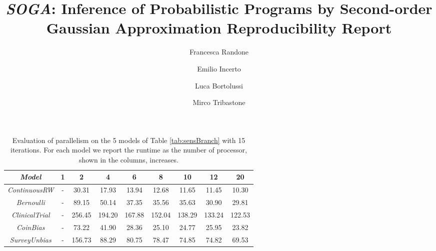 \documentclass[a4paper]{llncs}
\newcommand{\soga}{\textsl{SOGA}}
\begin{document}
\mainmatter

\title{\soga: Inference of Probabilistic Programs by Second-order Gaussian Approximation Reproducibility Report}


\author{Francesca Randone  \and Emilio Incerto  \and Luca Bortolussi  \and Mirco Tribastone}

\allowdisplaybreaks[0]

\maketitle
\setcounter{table}{4}
\begin{table}[t]
\caption{Evaluation of parallelism on the 5 models of Table \ref{tab:sensBranch} with 15 iterations. For each model we report the runtime as the number of processor, shown in the columns, increases.}
    \label{tab:parallel}
    \centering
    \begin{tabular}{ccccccccc}
\toprule
\emph{Model} & 1 & 2 & 4 & 6 & 8 & 10 & 12 & 20 \\
\midrule
\emph{ContinuousRW} & - & 30.31& 17.93& 13.94& 12.68& 11.65& 11.45& 10.30 \\
\emph{Bernoulli} & - & 89.15& 50.14& 37.35& 35.56& 35.63& 30.90& 29.81 \\
\emph{ClinicalTrial} & - & 256.45& 194.20& 167.88& 152.04& 138.29& 133.24& 122.53 \\
\emph{CoinBias} & - & 73.22& 41.90& 28.36& 25.10& 24.77& 25.95& 23.82 \\
\emph{SurveyUnbias} & -& 156.73& 88.29& 80.75& 78.47& 74.85& 74.82& 69.53 \\
\bottomrule
\end{tabular}
\end{table}
\end{document}
